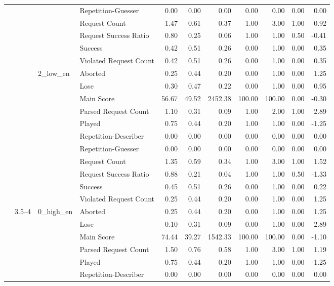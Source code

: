 \begin{tabular}{llllrrrrrrr}
 &  &  & Repetition-Guesser & 0.00 & 0.00 & 0.00 & 0.00 & 0.00 & 0.00 & 0.00 \\
 &  &  & Request Count & 1.47 & 0.61 & 0.37 & 1.00 & 3.00 & 1.00 & 0.92 \\
 &  &  & Request Success Ratio & 0.80 & 0.25 & 0.06 & 1.00 & 1.00 & 0.50 & -0.41 \\
 &  &  & Success & 0.42 & 0.51 & 0.26 & 0.00 & 1.00 & 0.00 & 0.35 \\
 &  &  & Violated Request Count & 0.42 & 0.51 & 0.26 & 0.00 & 1.00 & 0.00 & 0.35 \\
\cline{3-11}
 &  & \multirow[t]{11}{*}{2_low_en} & Aborted & 0.25 & 0.44 & 0.20 & 0.00 & 1.00 & 0.00 & 1.25 \\
 &  &  & Lose & 0.30 & 0.47 & 0.22 & 0.00 & 1.00 & 0.00 & 0.95 \\
 &  &  & Main Score & 56.67 & 49.52 & 2452.38 & 100.00 & 100.00 & 0.00 & -0.30 \\
 &  &  & Parsed Request Count & 1.10 & 0.31 & 0.09 & 1.00 & 2.00 & 1.00 & 2.89 \\
 &  &  & Played & 0.75 & 0.44 & 0.20 & 1.00 & 1.00 & 0.00 & -1.25 \\
 &  &  & Repetition-Describer & 0.00 & 0.00 & 0.00 & 0.00 & 0.00 & 0.00 & 0.00 \\
 &  &  & Repetition-Guesser & 0.00 & 0.00 & 0.00 & 0.00 & 0.00 & 0.00 & 0.00 \\
 &  &  & Request Count & 1.35 & 0.59 & 0.34 & 1.00 & 3.00 & 1.00 & 1.52 \\
 &  &  & Request Success Ratio & 0.88 & 0.21 & 0.04 & 1.00 & 1.00 & 0.50 & -1.33 \\
 &  &  & Success & 0.45 & 0.51 & 0.26 & 0.00 & 1.00 & 0.00 & 0.22 \\
 &  &  & Violated Request Count & 0.25 & 0.44 & 0.20 & 0.00 & 1.00 & 0.00 & 1.25 \\
\cline{2-11} \cline{3-11}
 & \multirow[t]{33}{*}{3.5--4} & \multirow[t]{11}{*}{0_high_en} & Aborted & 0.25 & 0.44 & 0.20 & 0.00 & 1.00 & 0.00 & 1.25 \\
 &  &  & Lose & 0.10 & 0.31 & 0.09 & 0.00 & 1.00 & 0.00 & 2.89 \\
 &  &  & Main Score & 74.44 & 39.27 & 1542.33 & 100.00 & 100.00 & 0.00 & -1.10 \\
 &  &  & Parsed Request Count & 1.50 & 0.76 & 0.58 & 1.00 & 3.00 & 1.00 & 1.19 \\
 &  &  & Played & 0.75 & 0.44 & 0.20 & 1.00 & 1.00 & 0.00 & -1.25 \\
 &  &  & Repetition-Describer & 0.00 & 0.00 & 0.00 & 0.00 & 0.00 & 0.00 & 0.00 \\

\end{tabular}
